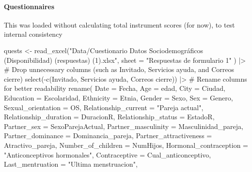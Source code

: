 \documentclass[
  bookmarksnumbered]{article}
\newenvironment{Shaded}{\begin{snugshade}}{\end{snugshade}}
\newcommand{\AttributeTok}[1]{\textcolor[rgb]{0.80,0.80,0.80}{#1}}
\newcommand{\CommentTok}[1]{\textcolor[rgb]{0.50,0.62,0.50}{#1}}
\newcommand{\FunctionTok}[1]{\textcolor[rgb]{0.94,0.94,0.56}{#1}}
\newcommand{\NormalTok}[1]{\textcolor[rgb]{0.80,0.80,0.80}{#1}}
\newcommand{\OtherTok}[1]{\textcolor[rgb]{0.94,0.94,0.56}{#1}}
\newcommand{\SpecialCharTok}[1]{\textcolor[rgb]{0.86,0.64,0.64}{#1}}
\newcommand{\StringTok}[1]{\textcolor[rgb]{0.80,0.58,0.58}{#1}}
\begin{document}
\paragraph{Questionnaires}\label{questionnaires}

This was loaded without calculating total instrument scores (for now), to test internal consistency

\begin{Shaded}
\begin{Highlighting}[]
\NormalTok{quests }\OtherTok{\textless{}{-}} \FunctionTok{read\_excel}\NormalTok{(}\StringTok{"Data/Cuestionario Datos Sociodemográficos  (Disponibilidad) (respuestas) (1).xlsx"}\NormalTok{,}
  \AttributeTok{sheet =} \StringTok{"Respuestas de formulario 1"}
\NormalTok{) }\SpecialCharTok{|\textgreater{}}
  \CommentTok{\# Drop unnecessary columns (such as \textquotesingle{}Invitado\textquotesingle{}, \textquotesingle{}Servicios ayuda\textquotesingle{}, and \textquotesingle{}Correos cierre\textquotesingle{})}
  \FunctionTok{select}\NormalTok{(}\SpecialCharTok{{-}}\FunctionTok{c}\NormalTok{(Invitado, }\StringTok{\textasciigrave{}}\AttributeTok{Servicios ayuda}\StringTok{\textasciigrave{}}\NormalTok{, }\StringTok{\textasciigrave{}}\AttributeTok{Correos cierre}\StringTok{\textasciigrave{}}\NormalTok{)) }\SpecialCharTok{|\textgreater{}}
  \CommentTok{\# Rename columns for better readability}
  \FunctionTok{rename}\NormalTok{(}
    \AttributeTok{Date =}\NormalTok{ Fecha,}
    \AttributeTok{Age =}\NormalTok{ edad,}
    \AttributeTok{City =}\NormalTok{ Ciudad,}
    \AttributeTok{Education =}\NormalTok{ Escolaridad,}
    \AttributeTok{Ethnicity =}\NormalTok{ Etnia,}
    \AttributeTok{Gender =}\NormalTok{ Sexo,}
    \AttributeTok{Sex =}\NormalTok{ Genero,}
    \AttributeTok{Sexual\_orientation =}\NormalTok{ OS,}
    \AttributeTok{Relationship\_current =} \StringTok{"Pareja actual"}\NormalTok{,}
    \AttributeTok{Relationship\_duration =}\NormalTok{ DuracionR,}
    \AttributeTok{Relationship\_status =}\NormalTok{ EstadoR,}
    \AttributeTok{Partner\_sex =}\NormalTok{ SexoParejaActual,}
    \AttributeTok{Partner\_masculinity =}\NormalTok{ Masculinidad\_pareja,}
    \AttributeTok{Partner\_dominance =}\NormalTok{ Dominancia\_pareja,}
    \AttributeTok{Partner\_attractiveness =}\NormalTok{ Atractivo\_pareja,}
    \AttributeTok{Number\_of\_children =}\NormalTok{ NumHijos,}
    \AttributeTok{Hormonal\_contraception =} \StringTok{"Anticonceptivos hormonales"}\NormalTok{,}
    \AttributeTok{Contraceptive =}\NormalTok{ Cual\_anticonceptivo,}
    \AttributeTok{Last\_mentruation =} \StringTok{"Ultima menstruacion"}\NormalTok{,}

\end{Highlighting}
\end{Shaded}
\end{document}
